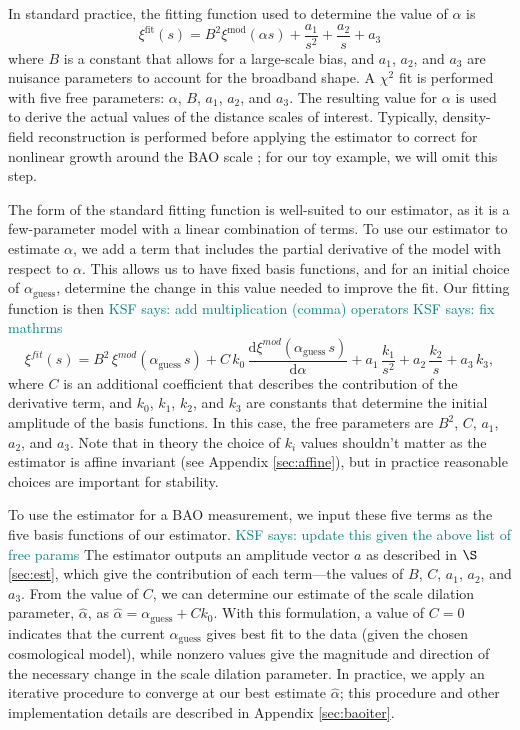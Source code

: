 \documentclass[modern]{aastex62}
\newcommand{\dd}{\mathrm{d}}
\newcommand{\KSF}[1]{\textcolor{teal}{KSF says: #1}}
\begin{document}
In standard practice, the fitting function used to determine the value of $\alpha$ is
\begin{equation}
\xi^{\text{fit}}(s) = B^2 \xi^{\text{mod}}(\alpha s) + \frac{a_1}{s^2} + \frac{a_2}{s} + a_3
\end{equation}
where $B$ is a constant that allows for a large-scale bias, and $a_1$, $a_2$, and $a_3$ are nuisance parameters to account for the broadband shape.
A $\chi^2$ fit is performed with five free parameters: $\alpha$, $B$, $a_1$, $a_2$, and $a_3$.
The resulting value for $\alpha$ is used to derive the actual values of the distance scales of interest.
Typically, density-field reconstruction is performed before applying the estimator to correct for nonlinear growth around the BAO scale \citep{Eisenstein2007}; for our toy example, we will omit this step.

The form of the standard fitting function is well-suited to our estimator, as it is a few-parameter model with a linear combination of terms.
To use our estimator to estimate $\alpha$, we add a term that includes the partial derivative of the model with respect to $\alpha$.
This allows us to have fixed basis functions, and for an initial choice of $\alpha_\mathrm{guess}$, determine the change in this value needed to improve the fit. 
Our fitting function is then
\KSF{add multiplication (comma) operators}
\KSF{fix mathrms}
\begin{equation} \label{eq:baoiter_fit}
\xi^{fit}(s) = B^2\,\xi^{mod}(\alpha_\mathrm{guess}\,s) + C\,k_0\,\frac{\dd \xi^{mod}(\alpha_\mathrm{guess}\,s)}{\dd \alpha} + a_1\,\frac{k_1}{s^2} + a_2\,\frac{k_2}{s} + a_3\,k_3 ,
\end{equation}
where $C$ is an additional coefficient that describes the contribution of the derivative term, and $k_0$, $k_1$, $k_2$, and $k_3$ are constants that determine the initial amplitude of the basis functions.
In this case, the free parameters are $B^2$, $C$, $a_1$, $a_2$, and $a_3$.
Note that in theory the choice of $k_i$ values shouldn't matter as the estimator is affine invariant (see Appendix \ref{sec:affine}), but in practice reasonable choices are important for stability.

To use the estimator for a BAO measurement, we input these five terms as the five basis functions of our estimator.
\KSF{update this given the above list of free params}
The estimator outputs an amplitude vector $a$ as described in $\S$\ref{sec:est}, which give the contribution of each term---the values of $B$, $C$, $a_1$, $a_2$, and $a_3$.
From the value of $C$, we can determine our estimate of the scale dilation parameter, $\hat{\alpha}$, as $\hat{\alpha} = \alpha_\mathrm{guess} + Ck_0$. 
With this formulation, a value of $C=0$ indicates that the current $\alpha_\mathrm{guess}$ gives best fit to the data (given the chosen cosmological model), while nonzero values give the magnitude and direction of the necessary change in the scale dilation parameter.
In practice, we apply an iterative procedure to converge at our best estimate $\hat{\alpha}$; this procedure and other implementation details are described in Appendix \ref{sec:baoiter}.
\end{document}
